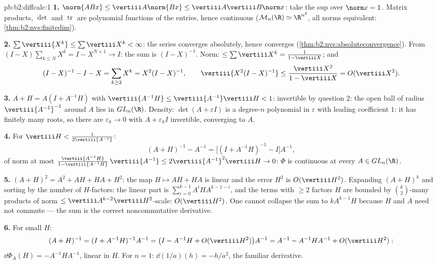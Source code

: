 \begin{solution}{pb:b2:diffcalc:1}
\textbf{1.} $\norm{ABx} \leq \vertiii A\norm{Bx} \leq
\vertiii A\vertiii B\norm x$: take the sup over $\norm x = 1$.
Matrix products, $\det$ and $\operatorname{tr}$ are polynomial
functions of the entries, hence continuous ($\mathcal M_n(\R)
\simeq \R^{n^2}$, all norms equivalent:
\cref{thm:b2:nvs:finitedim}).

\textbf{2.} $\sum\vertiii{X^k} \leq \sum\vertiii X^k <
\infty$: the series converges absolutely, hence converges
(\cref{thm:b2:nvs:absoluteconvergence}). From $(I -
X)\sum_{k\leq N}X^k = I - X^{N+1} \to I$: the sum is $(I -
X)^{-1}$. Norm: $\leq \sum\vertiii X^k = \frac{1}{1 -
\vertiii X}$; and
\[
(I - X)^{-1} - I - X = \sum_{k\geq2}X^k = X^2(I - X)^{-1},
\qquad
\vertiii{X^2(I-X)^{-1}} \leq
\frac{\vertiii X^2}{1 - \vertiii X} = O(\vertiii X^2).
\]

\textbf{3.} $A + H = A(I + A^{-1}H)$ with $\vertiii{A^{-1}H}
\leq \vertiii{A^{-1}}\vertiii H < 1$: invertible by question 2:
the open ball of radius $\vertiii{A^{-1}}^{-1}$ around $A$ lies
in $GL_n(\R)$. Density: $\det(A + \varepsilon I)$ is a degree-$n$
polynomial in $\varepsilon$ with leading coefficient $1$: it
has finitely many roots, so there are $\varepsilon_k \to 0$
with $A + \varepsilon_kI$ invertible, converging to $A$.

\textbf{4.} For $\vertiii H < \frac{1}{2\vertiii{A^{-1}}}$:
\[
(A + H)^{-1} - A^{-1}
= \bigl[(I + A^{-1}H)^{-1} - I\bigr]A^{-1},
\]
of norm at most $\frac{\vertiii{A^{-1}H}}{1 -
\vertiii{A^{-1}H}}\,\vertiii{A^{-1}} \leq
2\vertiii{A^{-1}}^2\vertiii H \to 0$: $\Phi$ is continuous at
every $A \in GL_n(\R)$.

\textbf{5.} $(A+H)^2 = A^2 + AH + HA + H^2$: the map $H
\mapsto AH + HA$ is linear and the error $H^2$ is
$O(\vertiii H^2)$. Expanding $(A + H)^k$ and sorting by the
number of $H$-factors: the linear part is
$\sum_{i=0}^{k-1}A^iHA^{k-1-i}$, and the terms with $\geq 2$
factors $H$ are bounded by $\binom k2$-many products of norm
$\leq \vertiii A^{k-2}\vertiii H^2$-scale: $O(\vertiii H^2)$.
One cannot collapse the sum to $kA^{k-1}H$ because $H$ and $A$
need not commute --- the sum is the correct noncommutative
derivative.

\textbf{6.} For small $H$:
\[
(A+H)^{-1} = (I + A^{-1}H)^{-1}A^{-1}
= \bigl(I - A^{-1}H + O(\vertiii H^2)\bigr)A^{-1}
= A^{-1} - A^{-1}HA^{-1} + O(\vertiii H^2) :
\]
$\dd\Phi_A(H) = -A^{-1}HA^{-1}$, linear in $H$. For $n = 1$:
$\dd(1/a)(h) = -h/a^2$, the familiar derivative.


\end{solution}
